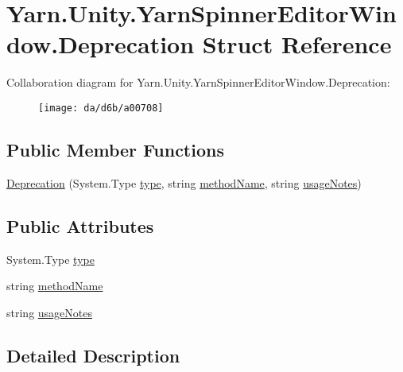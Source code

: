 \hypertarget{a00068}{\section{Yarn.\-Unity.\-Yarn\-Spinner\-Editor\-Window.\-Deprecation Struct Reference}
\label{a00068}
}


Collaboration diagram for Yarn.\-Unity.\-Yarn\-Spinner\-Editor\-Window.\-Deprecation\-:
\nopagebreak
\begin{figure}[H]
\begin{center}
\leavevmode
\texttt{[image: da/d6b/a00708]}
\end{center}
\end{figure}
\subsection*{Public Member Functions}
\begin{DoxyCompactItemize}
\item 
\hyperlink{a00068_ae80171841e97a48611c51a9a574a2fc0}{Deprecation} (System.\-Type \hyperlink{a00068_a750904df254223bf3131c39017f90a0b}{type}, string \hyperlink{a00068_a61605b2d0a17dfdf9c62952270d44fbd}{method\-Name}, string \hyperlink{a00068_ac23509be7ae6b43a3e2154dd430954a7}{usage\-Notes})
\end{DoxyCompactItemize}
\subsection*{Public Attributes}
\begin{DoxyCompactItemize}
\item 
System.\-Type \hyperlink{a00068_a750904df254223bf3131c39017f90a0b}{type}
\item 
string \hyperlink{a00068_a61605b2d0a17dfdf9c62952270d44fbd}{method\-Name}
\item 
string \hyperlink{a00068_ac23509be7ae6b43a3e2154dd430954a7}{usage\-Notes}
\end{DoxyCompactItemize}


\subsection{Detailed Description}


